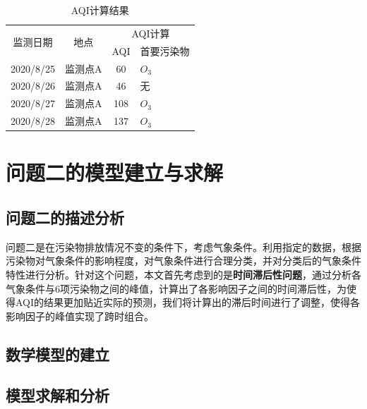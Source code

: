 \documentclass[a4paper,10pt]{my_paper}
\numberwithin{equation}{section}
\begin{document}
\begin{table}[htbp]
    \centering
    \caption{AQI计算结果}\label{tab3}%
      \begin{tabular}{cccp{5em}}
      \toprule
      \multirow{2}[2]{*}{监测日期} & \multirow{2}[2]{*}{地点} & \multicolumn{2}{c}{AQI计算} \\
            &       & \multicolumn{1}{p{4.055em}}{AQI} & 首要污染物 \\
      \midrule
      2020/8/25 & 监测点A  & 60    & ${O_3}$ \\
      2020/8/26 & 监测点A  & 46    & 无 \\
      2020/8/27 & 监测点A  & 108   & ${O_3}$ \\
      2020/8/28 & 监测点A  & 137   & ${O_3}$ \\
      \bottomrule
      \end{tabular}%
  \end{table}%
  


\section{问题二的模型建立与求解}
\subsection{问题二的描述分析}
问题二是在污染物排放情况不变的条件下，考虑气象条件。利用指定的数据，根据污染物对气象条件的影响程度，对气象条件进行合理分类，并对分类后的气象条件特性进行分析。针对这个问题，本文首先考虑到的是\textbf{时间滞后性问题}，通过分析各气象条件与6项污染物之间的峰值，计算出了各影响因子之间的时间滞后性，为使得AQI的结果更加贴近实际的预测，我们将计算出的滞后时间进行了调整，使得各影响因子的峰值实现了跨时组合。

\subsection{数学模型的建立}

\subsection{模型求解和分析}
\end{document}
